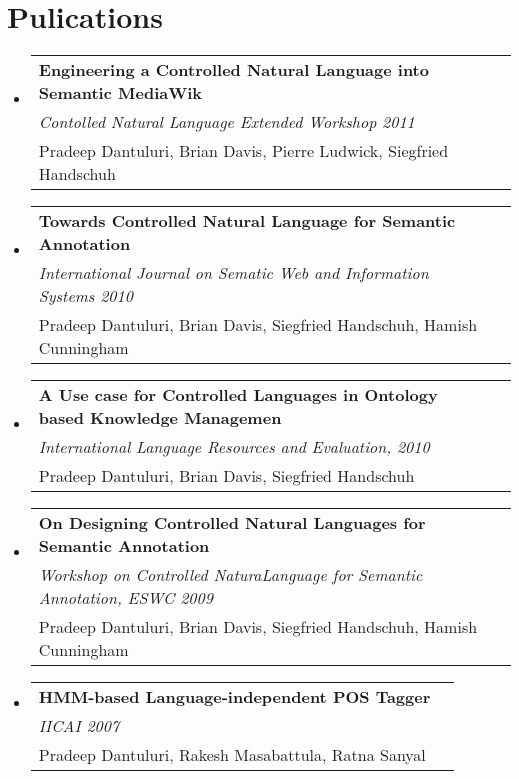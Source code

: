 \documentclass[letterpaper,11pt]{article}
\makeatletter
\newcommand{\pubItem}[3]{
  \vspace{-1pt}\item
    \begin{tabular*}{0.97\textwidth}[t]{l@{\extracolsep{\fill}}r}
      \textbf{#1} &   \\
      \textit{\small#2} &   \\
      \small#3 &  \\
    \end{tabular*}\vspace{-5pt}
}
\newcommand{\resumeSubHeadingListStart}{\begin{itemize}[leftmargin=*]}
\newcommand{\resumeSubHeadingListEnd}{\end{itemize}}
\makeatother
\begin{document}
\section{Pulications}
  \resumeSubHeadingListStart
    \pubItem
      {Engineering a Controlled Natural Language into Semantic MediaWik}
      {Contolled Natural Language Extended Workshop 2011}
      { Pradeep Dantuluri, Brian Davis, Pierre Ludwick, Siegfried Handschuh}
    \pubItem
      {Towards Controlled Natural Language for Semantic Annotation }
      {International Journal on Sematic Web and Information Systems 2010 }
      { Pradeep Dantuluri, Brian Davis, Siegfried Handschuh, Hamish Cunningham}
    \pubItem
      {A Use case for Controlled Languages in Ontology based Knowledge Managemen }
      { International Language Resources and Evaluation, 2010 }
      { Pradeep Dantuluri, Brian Davis, Siegfried Handschuh}
    \pubItem
      {On Designing Controlled Natural Languages for Semantic Annotation  }
      {Workshop on Controlled NaturaLanguage for Semantic Annotation, ESWC 2009 }
      { Pradeep Dantuluri, Brian Davis, Siegfried Handschuh, Hamish Cunningham}
    \pubItem
      {HMM-based Language-independent POS Tagger }
      {IICAI 2007}
      {Pradeep Dantuluri, Rakesh Masabattula, Ratna Sanyal}
  \resumeSubHeadingListEnd





\end{document}
